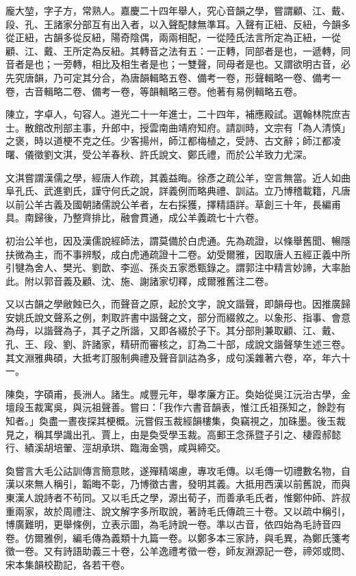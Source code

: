 \begin{pinyinscope}
龐大堃，字子方，常熟人。嘉慶二十四年舉人，究心音韻之學，嘗謂顧、江、戴、段、孔、王諸家分部互有出入者，以入聲配隸無準耳。入聲有正紐、反紐，今韻多從正紐，古韻多從反紐，陽奇陰偶，兩兩相配，一從陸氏法言所定為正紐，一從顧、江、戴、王所定為反紐。其轉音之法有五：一正轉，同部者是也，一遞轉，同音者是也；一旁轉，相比及相生者是也；一雙聲，同母者是也。又謂欲明古音，必先究唐韻，乃可定其分合，為唐韻輯略五卷、備考一卷，形聲輯略一卷、備考一卷，古音輯略二卷、備考一卷，等韻輯略三卷。他著有易例輯略五卷。

陳立，字卓人，句容人。道光二十一年進士，二十四年，補應殿試。選翰林院庶吉士。散館改刑部主事，升郎中，授雲南曲靖府知府。請訓時，文宗有「為人清慎」之褒，時以道梗不克之任。少客揚州，師江都梅植之，受詩、古文辭；師江都凌曙、儀徵劉文淇，受公羊春秋、許氏說文、鄭氏禮，而於公羊致力尤深。

文淇嘗謂漢儒之學，經唐人作疏，其義益晦。徐彥之疏公羊，空言無當。近人如曲阜孔氏、武進劉氏，謹守何氏之說，詳義例而略典禮、訓詁。立乃博稽載籍，凡唐以前公羊古義及國朝諸儒說公羊者，左右採獲，擇精語詳。草創三十年，長編甫具。南歸後，乃整齊排比，融會貫通，成公羊義疏七十六卷。

初治公羊也，因及漢儒說經師法，謂莫備於白虎通。先為疏證，以條舉舊聞、暢隱扶微為主，而不事辨駁，成白虎通疏證十二卷。幼受爾雅，因取唐人五經正義中所引犍為舍人、樊光、劉歆、李巡、孫炎五家悉甄錄之。謂郭注中精言妙諦，大率胎此。附以郭音義及顧、沈、施、謝諸家切釋，成爾雅舊注二卷。

又以古韻之學敝蝕已久，而聲音之原，起於文字，說文諧聲，即韻母也。因推廣歸安姚氏說文聲系之例，刺取許書中諧聲之文，部分而綴敘之。以象形、指事、會意為母，以諧聲為子，其子之所諧，又即各綴於子下。其分部則兼取顧、江、戴、孔、王、段、劉、許諸家，精研而審核之，訂為二十部，成說文諧聲孳生述三卷。其文淵雅典碩，大抵考訂服制典禮及聲音訓詁為多，成句溪雜著六卷，卒，年六十一。

陳奐，字碩甫，長洲人。諸生。咸豐元年，舉孝廉方正。奐始從吳江沅治古學，金壇段玉裁寓吳，與沅祖聲善。嘗曰：「我作六書音韻表，惟江氏祖孫知之，餘尟有知者。」奐盡一晝夜探其梗概。沅嘗假玉裁經韻樓集，奐竊視之，加硃墨。後玉裁見之，稱其學識出孔、賈上，由是奐受學玉裁。高郵王念孫暨子引之、棲霞郝懿行、績溪胡培翬、涇胡承珙、臨海金鶚，咸與締交。

奐嘗言大毛公詁訓傳言簡意賅，遂殫精竭慮，專攻毛傳。以毛傳一切禮數名物，自漢以來無人稱引，韜晦不彰，乃博徵古書，發明其義。大抵用西漢以前舊說，而與東漢人說詩者不茍同。又以毛氏之學，源出荀子，而善承毛氏者，惟鄭仲師、許叔重兩家，故於周禮注、說文解字多所取說，著詩毛氏傳疏三十卷。又以疏中稱引，博廣難明，更舉條例，立表示圖，為毛詩說一卷。準以古音，依四始為毛詩音四卷。仿爾雅例，編毛傳為義類十九篇一卷。以鄭多本三家詩，與毛異，為鄭氏箋考徵一卷。又有詩語助義三十卷，公羊逸禮考徵一卷，師友淵源記一卷，禘郊或問、宋本集韻校勘記，各若干卷。


\end{pinyinscope}
